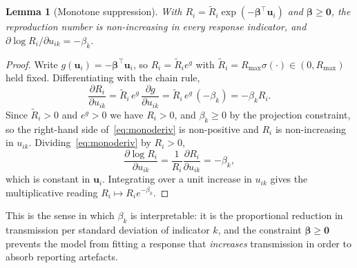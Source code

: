 \documentclass[conference]{IEEEtran}
\newtheorem{lemma}{Lemma}
\begin{document}
\begin{lemma}[Monotone suppression]\label{lem:mono}
With $R_i=\tilde R_i\exp(-\boldsymbol{\beta}^{\top}\mathbf{u}_i)$ and $\boldsymbol{\beta}\geq\mathbf{0}$, the reproduction number is non-increasing in every response indicator, and
$\partial \log R_i/\partial u_{ik}=-\beta_k$.
\end{lemma}
\begin{proof}
Write $g(\mathbf{u}_i)=-\boldsymbol{\beta}^{\top}\mathbf{u}_i$, so $R_i=\tilde R_i e^{g}$ with $\tilde R_i=R_{\max}\sigma(\cdot)\in(0,R_{\max})$ held fixed. Differentiating with the chain rule,
\begin{equation}
\frac{\partial R_i}{\partial u_{ik}}
=\tilde R_i\,e^{g}\,\frac{\partial g}{\partial u_{ik}}
=\tilde R_i\,e^{g}\,(-\beta_k)
=-\beta_k R_i .
\label{eq:monoderiv}
\end{equation}
Since $\tilde R_i>0$ and $e^{g}>0$ we have $R_i>0$, and $\beta_k\ge0$ by the projection constraint, so the right-hand side of~\eqref{eq:monoderiv} is non-positive and $R_i$ is non-increasing in $u_{ik}$. Dividing~\eqref{eq:monoderiv} by $R_i>0$,
\begin{equation}
\frac{\partial \log R_i}{\partial u_{ik}}=\frac{1}{R_i}\frac{\partial R_i}{\partial u_{ik}}=-\beta_k ,
\end{equation}
which is constant in $\mathbf{u}_i$. Integrating over a unit increase in $u_{ik}$ gives the multiplicative reading $R_i\mapsto R_i e^{-\beta_k}$.
\end{proof}

This is the sense in which $\beta_k$ is interpretable: it is the proportional reduction in transmission per standard deviation of indicator $k$, and the constraint $\boldsymbol{\beta}\geq\mathbf{0}$ prevents the model from fitting a response that \emph{increases} transmission in order to absorb reporting artefacts.
\end{document}
